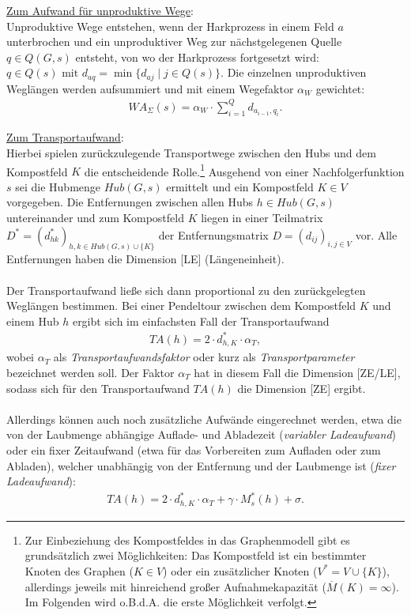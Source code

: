 \documentclass[fontsize=12pt,doubleside,openany,listof=totoc,listof=flat,listof=nochaptergap,numbers=noenddot]{article}
\begin{document}
\underline{Zum Aufwand für unproduktive Wege}:\\
Unproduktive Wege entstehen, wenn der Harkprozess in einem Feld $a$ unterbrochen und ein unproduktiver Weg zur nächstgelegenen Quelle $q \in Q(G,s)$ entsteht, von wo der Harkprozess fortgesetzt wird: $q \in Q(s) \text{ mit } d_{aq} = \min\{d_{aj} \mid j \in Q(s)\}.$ Die einzelnen unproduktiven Weglängen werden aufsummiert und mit einem Wegefaktor $\alpha_W$ gewichtet:
\begin{align*}
WA_{\Sigma}(s) =\alpha_W \cdot \sum_{i=1}^{Q} d_{a_{i-1},q_i}.
\end{align*}	



\underline{Zum Transportaufwand}:\\
Hierbei spielen zurückzulegende Transportwege zwischen den Hubs und dem Kompostfeld\label{Kompostfeld} $K$ die entscheidende Rolle.\footnote{Zur Einbeziehung des Kompostfeldes in das Graphenmodell gibt es grundsätzlich zwei Möglichkeiten: Das Kompostfeld ist ein bestimmter Knoten des Graphen ($K \in V$) oder ein zusätzlicher Knoten ($V^* = V\cup \{K\}$), allerdings jeweils mit hinreichend großer Aufnahmekapazität ($\overline{M}(K)=\infty$). Im Folgenden wird o.B.d.A. die erste Möglichkeit verfolgt.} Ausgehend von einer Nachfolgerfunktion $s$ sei die Hubmenge $Hub(G,s)$ ermittelt und ein Kompostfeld $K \in V$ vorgegeben. Die Entfernungen zwischen allen Hubs $h \in Hub(G,s)$ untereinander und zum Kompostfeld $K$ liegen in einer Teilmatrix $D^*=(d^*_{hk})_{h,k \in Hub(G,s)\cup \{K\}}$ der Entfernungsmatrix $D=(d_{ij})_{i,j \in V}$ vor. Alle Entfernungen haben die Dimension [LE] (Längeneinheit).\\
\\
Der Transportaufwand ließe sich dann proportional zu den zurückgelegten Weglängen bestimmen. Bei einer Pendeltour zwischen dem Kompostfeld $K$ und einem Hub $h$ ergibt sich im einfachsten Fall der Transportaufwand
\begin{align*}
TA(h) = 2 \cdot d^*_{h,K} \cdot \alpha_T,
\end{align*}		
wobei $\alpha_T$ als \textit{Transportaufwandsfaktor}\label{Transportaufwandsfaktor} oder kurz als \textit{Transportparameter} bezeichnet werden soll. Der Faktor $\alpha_T$ hat in diesem Fall die Dimension [ZE/LE], sodass sich für den Transportaufwand $TA(h)$ die Dimension [ZE] ergibt.
\\ \\
Allerdings können auch noch zusätzliche Aufwände eingerechnet werden, etwa die von der Laubmenge abhängige Auflade- und Abladezeit (\textit{variabler Ladeaufwand}\label{variabler Ladeaufwand}) oder ein fixer Zeitaufwand (etwa für das Vorbereiten zum Aufladen oder zum Abladen), welcher unabhängig von der Entfernung und der Laubmenge ist (\textit{fixer Ladeaufwand}\label{fixer Ladeaufwand}): 
\begin{align*}
TA(h) = 2 \cdot d^*_{h,K} \cdot \alpha_T + \gamma \cdot M^*_s(h) + \sigma.
\end{align*}
\end{document}
